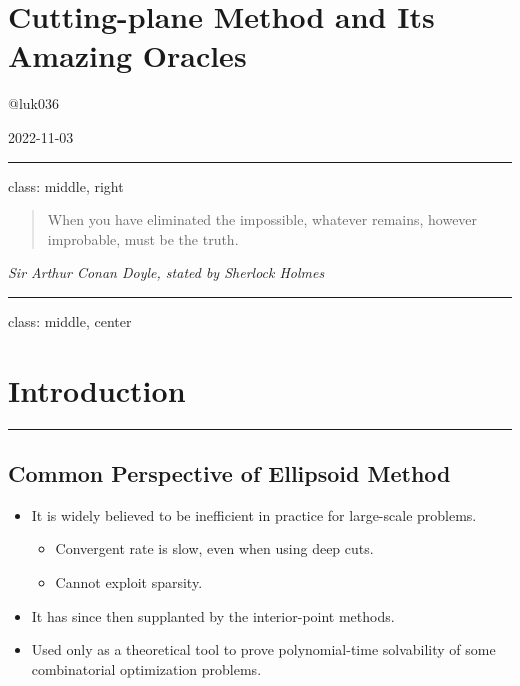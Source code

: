 \documentclass[
]{article}
\author{}
\date{}
\begin{document}
\section{Cutting-plane Method and Its Amazing
Oracles}\label{cutting-plane-method-and-its-amazing-oracles}

@luk036

2022-11-03

\begin{center}\rule{0.5\linewidth}{0.5pt}\end{center}

class: middle, right

\begin{quote}
When you have eliminated the impossible, whatever remains, however
improbable, must be the truth.
\end{quote}

\emph{Sir Arthur Conan Doyle, stated by Sherlock Holmes}

\begin{center}\rule{0.5\linewidth}{0.5pt}\end{center}

class: middle, center

\section{Introduction}\label{introduction}

\begin{center}\rule{0.5\linewidth}{0.5pt}\end{center}

\subsection{Common Perspective of Ellipsoid
Method}\label{common-perspective-of-ellipsoid-method}

\begin{itemize}
\item
  It is widely believed to be inefficient in practice for large-scale
  problems.

  \begin{itemize}
  \item
    Convergent rate is slow, even when using deep cuts.
  \item
    Cannot exploit sparsity.
  \end{itemize}
\item
  It has since then supplanted by the interior-point methods.
\item
  Used only as a theoretical tool to prove polynomial-time solvability
  of some combinatorial optimization problems.
\end{itemize}
\end{document}
